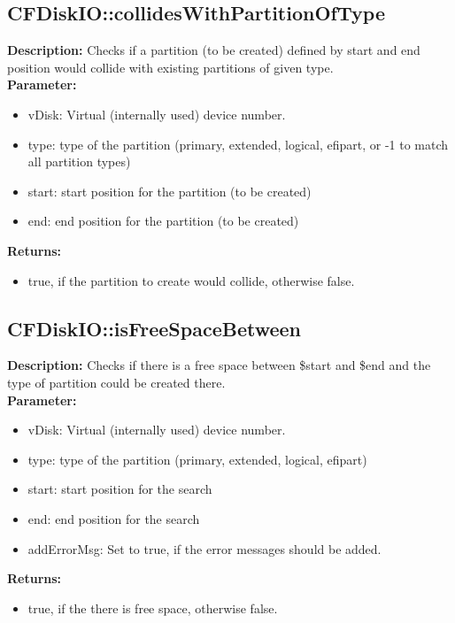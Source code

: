 \subsection{CFDiskIO::collidesWithPartitionOfType}
\textbf{Description:} Checks if a partition (to be created) defined by start and end position would collide with existing partitions of given type.\\
\textbf{Parameter:}
\begin{itemize}
\item vDisk: Virtual (internally used) device number.
\item type: type of the partition (primary, extended, logical, efipart, or -1 to match all partition types)
\item start: start position for the partition (to be created)
\item end: end position for the  partition (to be created)
\end{itemize}
\textbf{Returns:}
\begin{itemize}
\item true, if the partition to create would collide, otherwise false.
\end{itemize}

\subsection{CFDiskIO::isFreeSpaceBetween}
\textbf{Description:} Checks if there is a free space between \$start and \$end and the type of partition could be created there.\\
\textbf{Parameter:}
\begin{itemize}
\item vDisk: Virtual (internally used) device number.
\item type: type of the partition (primary, extended, logical, efipart)
\item start: start position for the search
\item end: end position for the search
\item addErrorMsg: Set to true, if the error messages should be added.
\end{itemize}
\textbf{Returns:}
\begin{itemize}
\item true, if the there is free space, otherwise false.
\end{itemize}

